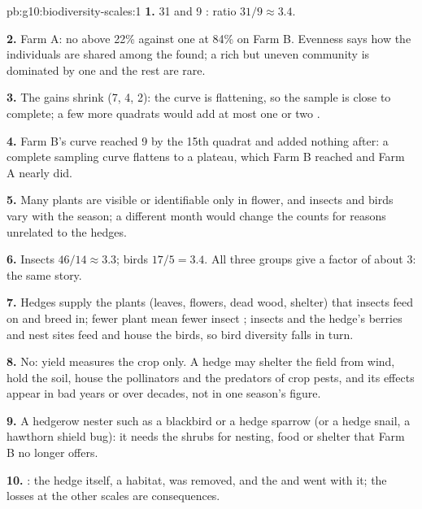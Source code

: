 \begin{solution}{pb:g10:biodiversity-scales:1}
\textbf{1.} 31 and 9 : ratio $31/9 \approx 3.4$.

\textbf{2.} Farm A: no  above 22\% against one at 84\% on
Farm B. Evenness says how the individuals are shared among the 
found; a rich but uneven community is dominated by one  and the
rest are rare.

\textbf{3.} The gains shrink (7, 4, 2): the curve is flattening, so
the sample is close to complete; a few more quadrats would add at most
one or two .

\textbf{4.} Farm B's curve reached 9 by the 15th quadrat and added
nothing after: a complete sampling curve flattens to a plateau, which
Farm B reached and Farm A nearly did.

\textbf{5.} Many plants are visible or identifiable only in flower,
and insects and birds vary with the season; a different month would
change the counts for reasons unrelated to the hedges.

\textbf{6.} Insects $46/14 \approx 3.3$; birds $17/5 = 3.4$. All three
groups give a factor of about 3: the same story.

\textbf{7.} Hedges supply the plants (leaves, flowers, dead wood,
shelter) that insects feed on and breed in; fewer plant  mean
fewer insect ; insects and the hedge's berries and nest sites
feed and house the birds, so bird diversity falls in turn.

\textbf{8.} No: yield measures the crop only. A hedge may shelter the
field from wind, hold the soil, house the pollinators and the
predators of crop pests, and its effects appear in bad years or over
decades, not in one season's figure.

\textbf{9.} A hedgerow nester such as a blackbird or a hedge sparrow
(or a hedge snail, a hawthorn shield bug): it needs the shrubs for
nesting, food or shelter that Farm B no longer offers.

\textbf{10.} : the hedge itself, a habitat, was removed, and
the  and  went with it; the losses at the other scales are
consequences.


\end{solution}
